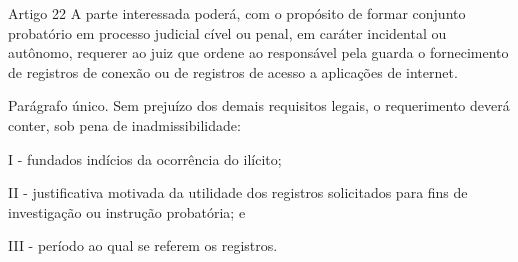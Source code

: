 \begin{frame}{Artigo 22}
A parte interessada poderá, com o propósito de formar conjunto probatório em processo judicial cível ou penal, em caráter incidental ou autônomo, requerer ao juiz que ordene ao responsável pela guarda o fornecimento de registros de conexão ou de registros de acesso a aplicações de internet.

Parágrafo único.  Sem prejuízo dos demais requisitos legais, o requerimento deverá conter, sob pena de inadmissibilidade:

I - fundados indícios da ocorrência do ilícito;

II - justificativa motivada da utilidade dos registros solicitados para fins de investigação ou instrução probatória; e

III - período ao qual se referem os registros.
\end{frame}
